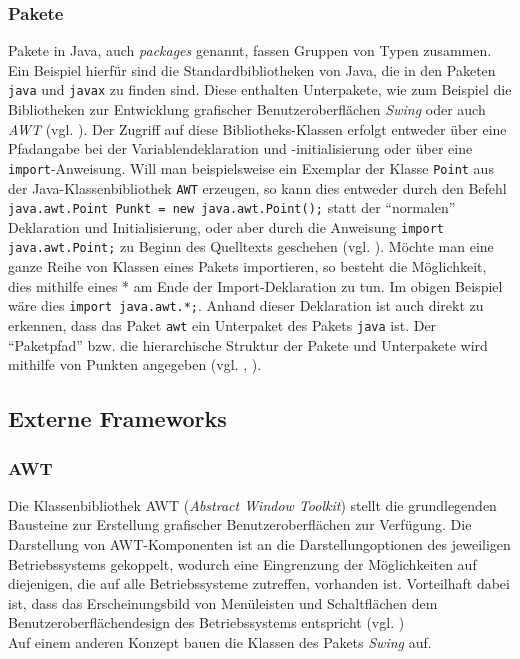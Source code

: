 \documentclass[paper=a4, DIV=14, BCOR=15mm, twoside=on, onecolumn=on, open = right, titlepage =on, parskip =half, headsepline = on, footsepline = on, chapterprefix = on, appendixprefix = off, fontsize = 12pt, numbers = noenddot, abstract = on]{scrbook}
\begin{document}
\subsubsection*{Pakete}

Pakete in Java, auch \emph{packages} genannt, fassen Gruppen von Typen zusammen. Ein Beispiel hierfür sind die Standardbibliotheken von Java, die in den Paketen \texttt{java} und \texttt{javax} zu finden sind. Diese enthalten Unterpakete, wie zum Beispiel die Bibliotheken zur Entwicklung grafischer Benutzeroberflächen \emph{Swing} oder auch \emph{AWT} (vgl. \cite[S.265]{ullenboom:12}).
Der Zugriff auf diese Bibliotheks-Klassen erfolgt entweder über eine Pfadangabe bei der Variablendeklaration und -initialisierung oder über eine \texttt{import}-Anweisung. Will man beispielsweise ein Exemplar der Klasse \texttt{Point} aus der Java-Klassenbibliothek \texttt{AWT} erzeugen, so kann dies entweder durch den Befehl \texttt{java.awt.Point Punkt = new java.awt.Point();} statt der "`normalen"' Deklaration und Initialisierung, oder aber durch die Anweisung \texttt{import java.awt.Point;} zu Beginn des Quelltexts geschehen (vgl. \cite[S.266]{ullenboom:12}).
Möchte man eine ganze Reihe von Klassen eines Pakets importieren, so besteht die Möglichkeit, dies mithilfe eines * am Ende der Import-Deklaration zu tun. Im obigen Beispiel wäre dies \texttt{import java.awt.*;}. Anhand dieser Deklaration ist auch direkt zu erkennen, dass das Paket \texttt{awt} ein Unterpaket des Pakets \texttt{java} ist. Der "`Paketpfad"' bzw. die hierarchische Struktur der Pakete und Unterpakete wird mithilfe von Punkten angegeben (vgl. \cite[S.265ff.]{ullenboom:12}, \cite[S.84ff.]{abts:15}).

\subsection{Externe Frameworks}

\subsubsection*{AWT}

Die Klassenbibliothek AWT (\emph{Abstract Window Toolkit}) stellt die grundlegenden Bausteine zur Erstellung grafischer Benutzeroberflächen zur Verfügung. Die Darstellung von AWT-Komponenten ist an die Darstellungoptionen des jeweiligen Betriebssystems gekoppelt, wodurch eine Eingrenzung der Möglichkeiten auf diejenigen, die auf alle Betriebssysteme zutreffen, vorhanden ist. Vorteilhaft dabei ist, dass das Erscheinungsbild von Menüleisten und Schaltflächen dem Benutzeroberflächendesign des Betriebssystems entspricht (vgl. \cite[S.279]{abts:15})\\
Auf einem anderen Konzept bauen die Klassen des Pakets \emph{Swing} auf. 
\end{document}
